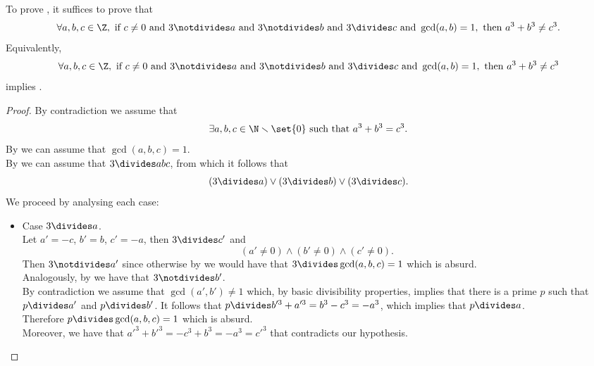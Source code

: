 \begin{theorem}
  \label{thm:fermatLastTheoremThree_of_three_dvd_only_c}
  \leanok
  To prove , it suffices to prove that
  $$\forall a, b, c \in \Z, \text{ if } c \neq 0 \text{ and } 3 \notdivides a \text{ and }
  3 \notdivides b \text{ and } 3 \divides c \text{ and } \gcd(a,b)=1,
  \text{ then } a^3 + b^3 \neq c^3.$$
  Equivalently, $$\forall a, b, c \in \Z, \text{ if } c \neq 0 \text{ and } 3 \notdivides a \text{ and }
  3 \notdivides b \text{ and } 3 \divides c \text{ and } \gcd(a,b)=1,
  \text{ then } a^3 + b^3 \neq c^3$$ implies .
\end{theorem}
\begin{proof}
  \leanok
  By contradiction we assume that
  $$\exists a,b,c \in \N \smallsetminus \set{0} \text{ such that } a^3 + b^3 = c^3.$$
  By 
  we can assume that $\gcd(a,b,c)=1$. \\
  By  we can assume that $3 \divides a b c$,
  from which it follows that $$(3 \divides a) \lor (3 \divides b) \lor (3 \divides c).$$
  We proceed by analysing each case:
  \begin{itemize}
      \item Case $3 \divides a$. \\
      Let $a'=-c$, $b'=b$, $c'=-a$, then $3 \divides c'$ and
      $$(a'\neq 0) \land (b'\neq 0) \land (c' \neq 0).$$
      Then $3 \notdivides a'$ since otherwise by 
      we would have that $3 \divides \gcd(a,b,c)=1$ which is absurd. \\
      Analogously, by  we have that $3 \notdivides b'$.\\
      By contradiction we assume that $\gcd(a',b') \neq 1$ which, by basic divisibility properties,
      implies that there is a prime $p$ such that $p \divides a'$ and $p \divides b'$.
      It follows that $p \divides b'^3 + a'^3 = b^3 - c^3 = -a^3$, which implies that $p \divides a$.\\
      Therefore $p \divides \gcd(a,b,c)=1$ which is absurd. \\
      Moreover, we have that $a'^3 + b'^3 = -c^3 + b^3 = -a^3 = c'^3$ that contradicts our hypothesis.

\end{itemize}
\end{proof}
